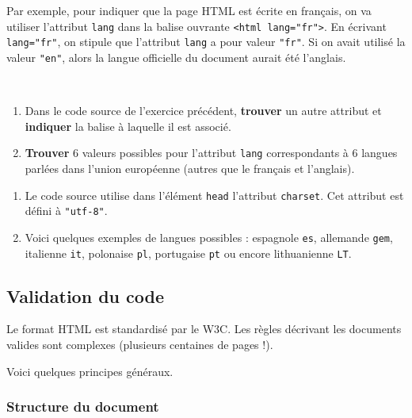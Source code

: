 \documentclass[a4paper,17pt]{extarticle}
\newenvironment{eleve}%
{\begin{activite}\color{noiramu}\\}
{\end{activite}}
\providecommand{\tightlist}{%
      \setlength{\itemsep}{0pt}\setlength{\parskip}{0pt}}
\begin{document}
\begin{exemple}
    Par exemple, pour indiquer que la page HTML est écrite en français, on
va utiliser l'attribut \texttt{lang} dans la balise ouvrante
\texttt{\textless{}html\ lang="fr"\textgreater{}}. En écrivant
\texttt{lang="fr"}, on stipule que l'attribut \texttt{lang} a pour
valeur \texttt{"fr"}. Si on avait utilisé la valeur \texttt{"en"}, alors
la langue officielle du document aurait été l'anglais.

            \end{exemple}\begin{eleve}
    \begin{enumerate}
\def\labelenumi{\arabic{enumi}.}
\tightlist
\item
  Dans le code source de l'exercice précédent, \textbf{trouver} un autre
  attribut et \textbf{indiquer} la balise à laquelle il est associé.
\item
  \textbf{Trouver} 6 valeurs possibles pour l'attribut \texttt{lang}
  correspondants à 6 langues parlées dans l'union européenne (autres que
  le français et l'anglais).
\end{enumerate}
        
        \end{eleve}\begin{reponse}
    \begin{enumerate}
\def\labelenumi{\arabic{enumi}.}
\tightlist
\item
  Le code source utilise dans l'élément \texttt{head} l'attribut
  \texttt{charset}. Cet attribut est défini à \texttt{"utf-8"}.
\item
  Voici quelques exemples de langues possibles : espagnole \texttt{es},
  allemande \texttt{gem}, italienne \texttt{it}, polonaise \texttt{pl},
  portugaise \texttt{pt} ou encore lithuanienne \texttt{LT}.
\end{enumerate}

            \end{reponse}
    \hypertarget{validation-du-code}{%
\subsection{Validation du code}\label{validation-du-code}}

    Le format HTML est standardisé par le W3C. Les règles décrivant les
documents valides sont complexes (plusieurs centaines de pages !).

Voici quelques principes généraux.

\hypertarget{structure-du-document}{%
\subsubsection{Structure du document}\label{structure-du-document}}
\end{document}
